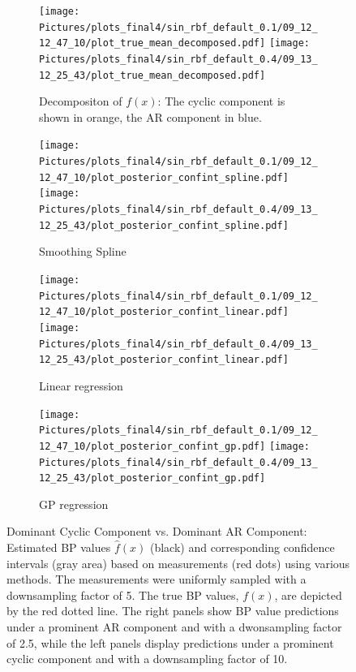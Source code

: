 \begin{figure}
\begin{subfigure}{\textwidth}
    \centering
    \texttt{[image: 
        Pictures/plots\_final4/sin\_rbf\_default\_0.1/09\_12\_12\_47\_10/plot\_true\_mean\_decomposed.pdf]}
    \texttt{[image: 
     Pictures/plots\_final4/sin\_rbf\_default\_0.4/09\_13\_12\_25\_43/plot\_true\_mean\_decomposed.pdf]}
  \caption{Decompositon of $f(x)$: The cyclic component is shown in orange, the AR component in blue.}
\end{subfigure}

\begin{subfigure}{\textwidth}
    \centering
    \texttt{[image: 
        Pictures/plots\_final4/sin\_rbf\_default\_0.1/09\_12\_12\_47\_10/plot\_posterior\_confint\_spline.pdf]}
    \texttt{[image: 
        Pictures/plots\_final4/sin\_rbf\_default\_0.4/09\_13\_12\_25\_43/plot\_posterior\_confint\_spline.pdf]}
  \caption{Smoothing Spline}
\end{subfigure}

\begin{subfigure}{\textwidth}
    \centering
    \texttt{[image: 
        Pictures/plots\_final4/sin\_rbf\_default\_0.1/09\_12\_12\_47\_10/plot\_posterior\_confint\_linear.pdf]}
    \texttt{[image: 
        Pictures/plots\_final4/sin\_rbf\_default\_0.4/09\_13\_12\_25\_43/plot\_posterior\_confint\_linear.pdf]}
  \caption{Linear regression }
\end{subfigure}

\begin{subfigure}{\textwidth}
    \centering
    \texttt{[image: 
        Pictures/plots\_final4/sin\_rbf\_default\_0.1/09\_12\_12\_47\_10/plot\_posterior\_confint\_gp.pdf]}
    \texttt{[image: 
        Pictures/plots\_final4/sin\_rbf\_default\_0.4/09\_13\_12\_25\_43/plot\_posterior\_confint\_gp.pdf]}
  \caption{GP regression}
\end{subfigure}\hfill
\caption[Dominant Cyclic Component vs. Dominant AR Component]{
Dominant Cyclic Component vs. Dominant AR Component:
    Estimated BP values $\hat{f}(x)$ (black) and corresponding confidence intervals (gray area)
    based on measurements (red dots) using various methods.
    The measurements were uniformly sampled with a downsampling factor of 5.
    The true BP values, $f(x)$, are depicted by the red dotted line.
    The right panels show BP value predictions under a prominent AR component and with a dwonsampling factor of 2.5,
    while the left panels display predictions under a prominent cyclic component and with a downsampling factor of 10.
 }
\label{fig:ex-ar-cyclic}
\end{figure}



